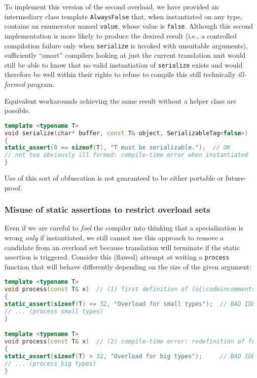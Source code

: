 \noindent To implement this version of the second overload, we have provided an
intermediary class template \lstinline!AlwaysFalse! that, when instantiated
on any type, contains an enumerator named \lstinline!value!, whose value is
\lstinline!false!. Although this second implementation is more likely to
produce the desired result (i.e., a controlled compilation failure
only when \lstinline!serialize! is invoked with unsuitable arguments),
sufficiently ``smart'' compilers looking at just the current translation
unit would still be able to know that no valid instantiation of
\lstinline!serialize! exists and would therefore be well within their
rights to refuse to compile this still technically \emph{ill-formed}
program.

Equivalent workarounds achieving the same result without a
helper class are possible.

\begin{lstlisting}[language=C++]
template <typename T>
void serialize(char* buffer, const T& object, SerializableTag<false>)  // (2c)
{
static_assert(0 == sizeof(T), "T must be serializable.");  // OK
// not too obviously ill formed: compile-time error when instantiated
}
\end{lstlisting}

\noindent Use of this sort of obfuscation is not guaranteed to be either
portable or future-proof.

\subsubsection[Misuse of static assertions to restrict overload sets]{Misuse of static assertions to restrict overload sets}\label{misuse-of-static-assertions-to-restrict-overload-sets}

Even if we are careful to \emph{fool} the compiler into thinking that a
specialization is wrong \emph{only} if instantiated, we still cannot use
this approach to remove a candidate from an overload set because translation
will terminate if the static assertion is triggered. Consider this
(flawed) attempt at writing a \lstinline!process! function that will behave
differently depending on the size of the given argument:

\begin{lstlisting}[language=C++]
template <typename T>
void process(const T& x)  // (1) first definition of (ù{\codeincomments{process}}ù) function
{
static_assert(sizeof(T) <= 32, "Overload for small types");  // BAD IDEA
// ... (process small types)
}

template <typename T>
void process(const T& x)  // (2) compile-time error: redefinition of function
{
static_assert(sizeof(T) > 32, "Overload for big types");     // BAD IDEA
// ... (process big types)
}
\end{lstlisting}

